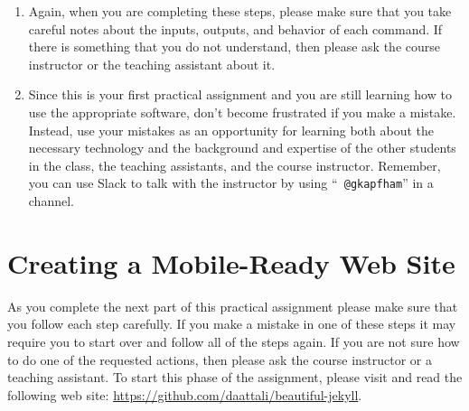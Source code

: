 \begin{enumerate}
  \item Again, when you are completing these steps, please make sure that you take careful notes about the inputs,
    outputs, and behavior of each command. If there is something that you do not understand, then please ask the course
    instructor or the teaching assistant about it.

  \item Since this is your first practical assignment and you are still learning how to use the appropriate software,
    don't become frustrated if you make a mistake. Instead, use your mistakes as an opportunity for learning both about
    the necessary technology and the background and expertise of the other students in the class, the teaching
    assistants, and the course instructor. Remember, you can use Slack to talk with the instructor by using ``{\tt
    @gkapfham}'' in a channel.

\end{enumerate}

\vspace*{-.15in}
\section*{Creating a Mobile-Ready Web Site}

As you complete the next part of this practical assignment please make sure that you follow each step carefully. If you
make a mistake in one of these steps it may require you to start over and follow all of the steps again. If you are not
sure how to do one of the requested actions, then please ask the course instructor or a teaching assistant. To start
this phase of the assignment, please visit and read the following web site:
\url{https://github.com/daattali/beautiful-jekyll}.

